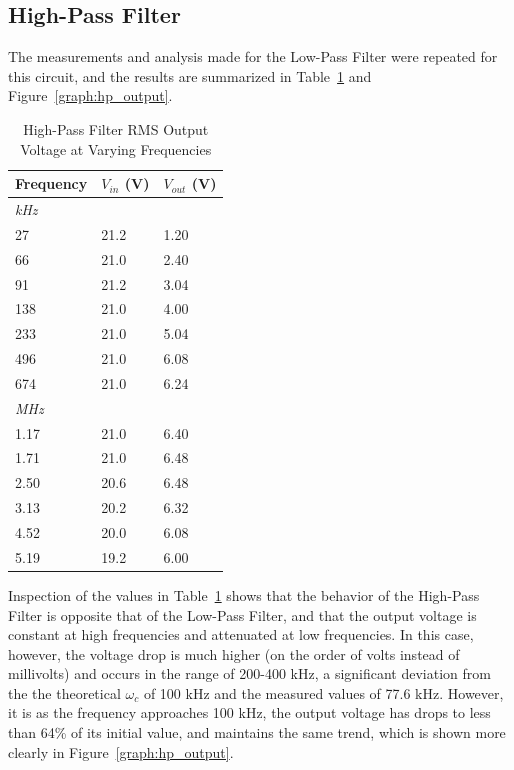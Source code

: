 \documentclass[twocolumn,english]{IEEEtran}
\theoremstyle{plain}
\theoremstyle{plain}
\begin{document}
\clearpage



	\subsection{High-Pass Filter}
	The measurements and analysis made for the Low-Pass Filter were repeated for this circuit, and the results are summarized in Table~\ref{tb:hp_output} and Figure~\ref{graph:hp_output}.

		\begin{table}[H]
			\caption{High-Pass Filter RMS Output Voltage at Varying Frequencies}
			\label{tb:hp_output}
			\centering
		\begin{tabular}{@{}lll@{}}
		\toprule
		Frequency    & $V_{in}$ (V) & $V_{out}$ (V) \\
		\midrule
		\textit{kHz} &      	&       \\
		27           & 21.2 	& 1.20  \\
		66           & 21.0   	& 2.40  \\
		91           & 21.2 	& 3.04  \\
		138          & 21.0   	& 4.00  \\
		233          & 21.0   	& 5.04  \\
		496          & 21.0   	& 6.08  \\
		674          & 21.0   	& 6.24  \\
		\midrule
		\textit{MHz} &      	&       \\
		1.17         & 21.0   	& 6.40  \\
		1.71         & 21.0   	& 6.48  \\
		2.50         & 20.6 	& 6.48  \\
		3.13         & 20.2 	& 6.32  \\
		4.52         & 20.0   	& 6.08  \\
		5.19         & 19.2 	& 6.00  \\ \bottomrule
		\end{tabular}
		\end{table}

		Inspection of the values in Table~\ref{tb:hp_output} shows that the behavior of the High-Pass Filter is opposite that of the Low-Pass Filter, and that the output voltage is constant at high frequencies and attenuated at low frequencies. In this case, however, the voltage drop is much higher (on the order of volts instead of millivolts) and occurs in the range of 200-400 kHz, a significant deviation from the the theoretical $\omega_c$ of 100 kHz and the measured values of 77.6 kHz. However, it is as the frequency approaches 100 kHz, the output voltage has drops to less than 64\% of its initial value, and maintains the same trend, which is shown more clearly in Figure~\ref{graph:hp_output}.
\end{document}

